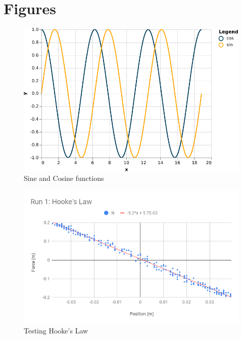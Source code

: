 \section{Figures}
\begin{figure}[ht]
    \centering
    \includegraphics{chart/11-shm/trig.pdf}
    \caption{Sine and Cosine functions}
    \label{figure:11.sin.cos}
\end{figure}
\begin{figure}[ht]
    \centering
    \includegraphics[scale=0.71]{image/11-shm/run-1-hooke.png}
    \caption{Testing Hooke's Law}
    \label{figure.11.hooke}
\end{figure}
